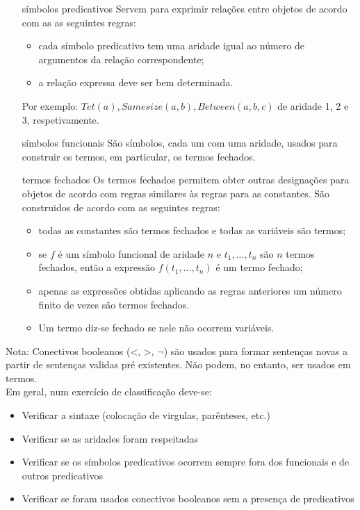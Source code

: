 \documentclass[10pt,a4paper]{report}
\begin{document}
\begin{itemize}
\item[símbolos predicativos] Servem para exprimir relações entre objetos de acordo com as as
seguintes regras:
\begin{itemize}
\item cada símbolo predicativo tem uma aridade igual ao número de
argumentos da relação correspondente;
\item a relação expressa deve ser bem determinada.
\end{itemize}
Por exemplo: $Tet(a), Samesize(a, b), Between(a, b, c)$ de aridade 1, 2 e 3, respetivamente.
\item[símbolos funcionais] São símbolos, cada um com uma aridade, usados para construir os
termos, em particular, os termos fechados.
\item[termos fechados] Os termos fechados permitem obter outras designações para objetos
de acordo com regras similares às regras para as constantes. São construidos de acordo com as seguintes regras:
\begin{itemize}
\item todas as constantes são termos fechados e todas as variáveis são termos;
\item se $f$ é um símbolo funcional de aridade $n$ e $t_1, ... , t_n$ são $n$ termos
fechados, então a expressão $f(t_1, ..., t_n)$ é um termo fechado;
\item apenas as expressões obtidas aplicando as regras anteriores um
número finito de vezes são termos fechados.
\item Um termo diz-se fechado se nele não ocorrem variáveis.
\end{itemize}
\end{itemize}
Nota: Conectivos booleanos (<, >, $\neg$) são usados para formar sentenças novas a partir de sentenças validas pré existentes. Não podem, no entanto, ser usados em termos.\\
Em geral, num exercício de classificação deve-se:
\begin{itemize}
\item Verificar a sintaxe (colocação de virgulas, parênteses, etc.)
\item Verificar se as aridades foram respeitadas
\item Verificar se os símbolos predicativos ocorrem sempre fora dos funcionais e de outros predicativos
\item Verificar se foram usados conectivos booleanos sem a presença de predicativos
\end{itemize}
\end{document}
